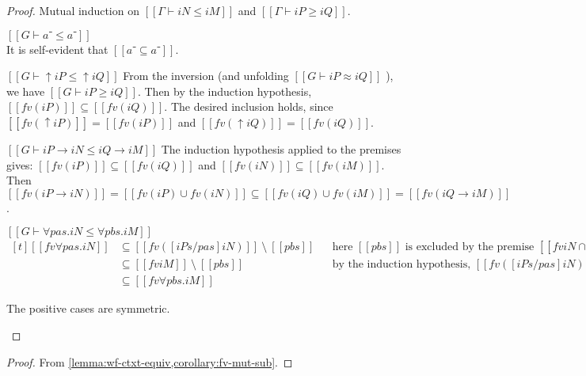 \lemmaFvPropagation*
\begin{proof}
  Mutual induction on $[[Γ ⊢ iN ≤ iM]]$ and $[[Γ ⊢ iP ≥ iQ]]$.
  \begin{caseof}
  \item $[[G ⊢ a⁻ ≤ a⁻]]$\\
    It is self-evident that $[[{a⁻} ⊆ {a⁻}]]$.
  \item $[[G ⊢ ↑iP ≤ ↑iQ]]$
    From the inversion (and unfolding $[[G ⊢ iP ≈ iQ]]$ ), we have
    $[[G ⊢ iP ≥ iQ]]$. Then by the induction hypothesis,
    $[[fv(iP)]] \subseteq [[fv(iQ)]]$. The desired 
    inclusion holds, since $[[fv(↑iP)]] = [[fv(iP)]]$ and
    $[[fv(↑iQ)]] = [[fv(iQ)]]$.
  \item $[[G ⊢ iP → iN ≤ iQ → iM]]$
    The induction hypothesis applied to the premises gives:
    $[[fv(iP)]] \subseteq [[fv(iQ)]]$ and
    $[[fv(iN)]] \subseteq [[fv(iM)]]$.
    Then $[[fv(iP → iN)]] = [[fv(iP) ∪ fv(iN)]] \subseteq
    [[fv(iQ) ∪ fv(iM)]] = [[fv(iQ → iM)]]$.

  \item $[[G ⊢ ∀pas.iN ≤ ∀pbs.iM]]$\\
    $
    \begin{aligned}[t]
      [[fv ∀pas.iN ]] &\subseteq [[fv ([iPs/pas] iN) ]] ~\setminus~ [[{pbs}]] 
                      &&   \text{here $[[{pbs}]]$ is excluded by the premise $[[fv iN ∩ {pbs} = ∅]]$}\\
                      &\subseteq [[fv iM]] ~\setminus~ [[{pbs}]]
                      &&   \text{by the induction hypothesis, } [[fv ([iPs/pas] iN) ]] \subseteq [[fv iM]] \\
                      &\subseteq [[fv ∀pbs.iM]]
    \end{aligned}
    $
  \item The positive cases are symmetric.
  \end{caseof}
\end{proof}

\corollaryFvMutSub*

\lemmaMutSubTypesWfEquiv*
\begin{proof}
  From \cref{lemma:wf-ctxt-equiv,corollary:fv-mut-sub}.
\end{proof}


